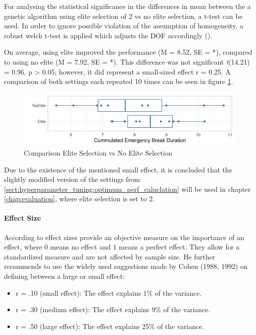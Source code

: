 For analysing the statistical significance in the differences in mean between the a genetic algorithm using elite selection of 2 vs no elite selection, a t-test can be used. In order to ignore possible violation of the assumption of homogeneity, a robust welch t-test is applied which adjusts the DOF accordingly (\cite{field_discovering_2012}).

On average, using elite improved the performance (M = 8.52, SE = *), compared to using no elite (M = 7.92, SE = *). This difference was not significant \textit{t}(14.21) = 0.96, p > 0.05; however, it did represent a small-sized effect r = 0.25. A comparison of both settings each repeated 10 times can be seen in figure \ref{fig:hyperparameter_tuning:elite_comparison}.

\begin{figure}[ht] 
	\label{fig:hyperparameter_tuning:elite_comparison}
	\includegraphics[width=1\linewidth]{simulations/evaluation/plots/elite_vs_no_elite}
	\caption{Comparison Elite Selection vs No Elite Selection}
\end{figure}

Due to the existence of the mentioned small effect, it is concluded that the slightly modified version of the settings from \ref{sect:hyperparameter_tuning:optimum_perf_caluclation} will be used in chapter \ref{chap:evaluation}, where elite selection is set to 2.

\paragraph{Effect Size}
According to \cite{field_discovering_2012} effect sizes provide an objective measure on the importance of an effect, where 0 means no effect and 1 means a perfect effect. They allow for a standardized measure and are not affected by sample size. He further recommends to use the widely used suggestions made by Cohen (1988, 1992)  on defining between a large or small effect:
\begin{itemize}
	\item r = .10 (small effect): The effect explains 1\% of the variance. 
	\item r = .30 (medium effect): The effect explains 9\% of the variance. 
	\item r = .50 (large effect): The effect explains 25\% of the variance.
\end{itemize} 

